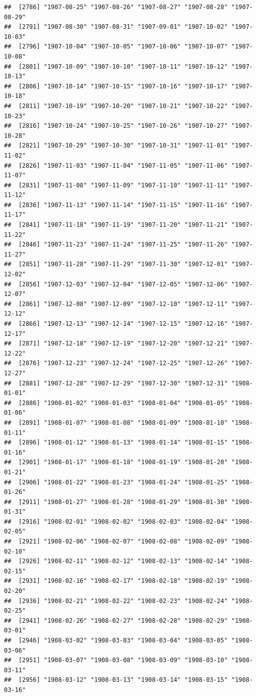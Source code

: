 \documentclass{article}\usepackage[]{graphicx}\usepackage[]{color}
\makeatletter
\newenvironment{kframe}{%
 \def\at@end@of@kframe{}%
 \ifinner\ifhmode%
  \def\at@end@of@kframe{\end{minipage}}%
  \begin{minipage}{\columnwidth}%
 \fi\fi%
 \def\FrameCommand##1{\hskip\@totalleftmargin \hskip-\fboxsep
 \colorbox{shadecolor}{##1}\hskip-\fboxsep
     \hskip-\linewidth \hskip-\@totalleftmargin \hskip\columnwidth}%
 \MakeFramed {\advance\hsize-\width
   \@totalleftmargin\z@ \linewidth\hsize
   \@setminipage}}%
 {\par\unskip\endMakeFramed%
 \at@end@of@kframe}
\newenvironment{knitrout}{}{} %
\makeatother
\begin{document}
\begin{description}
\begin{knitrout}
\begin{kframe}
\begin{verbatim}
##  [2786] "1907-08-25" "1907-08-26" "1907-08-27" "1907-08-28" "1907-08-29"
##  [2791] "1907-08-30" "1907-08-31" "1907-09-01" "1907-10-02" "1907-10-03"
##  [2796] "1907-10-04" "1907-10-05" "1907-10-06" "1907-10-07" "1907-10-08"
##  [2801] "1907-10-09" "1907-10-10" "1907-10-11" "1907-10-12" "1907-10-13"
##  [2806] "1907-10-14" "1907-10-15" "1907-10-16" "1907-10-17" "1907-10-18"
##  [2811] "1907-10-19" "1907-10-20" "1907-10-21" "1907-10-22" "1907-10-23"
##  [2816] "1907-10-24" "1907-10-25" "1907-10-26" "1907-10-27" "1907-10-28"
##  [2821] "1907-10-29" "1907-10-30" "1907-10-31" "1907-11-01" "1907-11-02"
##  [2826] "1907-11-03" "1907-11-04" "1907-11-05" "1907-11-06" "1907-11-07"
##  [2831] "1907-11-08" "1907-11-09" "1907-11-10" "1907-11-11" "1907-11-12"
##  [2836] "1907-11-13" "1907-11-14" "1907-11-15" "1907-11-16" "1907-11-17"
##  [2841] "1907-11-18" "1907-11-19" "1907-11-20" "1907-11-21" "1907-11-22"
##  [2846] "1907-11-23" "1907-11-24" "1907-11-25" "1907-11-26" "1907-11-27"
##  [2851] "1907-11-28" "1907-11-29" "1907-11-30" "1907-12-01" "1907-12-02"
##  [2856] "1907-12-03" "1907-12-04" "1907-12-05" "1907-12-06" "1907-12-07"
##  [2861] "1907-12-08" "1907-12-09" "1907-12-10" "1907-12-11" "1907-12-12"
##  [2866] "1907-12-13" "1907-12-14" "1907-12-15" "1907-12-16" "1907-12-17"
##  [2871] "1907-12-18" "1907-12-19" "1907-12-20" "1907-12-21" "1907-12-22"
##  [2876] "1907-12-23" "1907-12-24" "1907-12-25" "1907-12-26" "1907-12-27"
##  [2881] "1907-12-28" "1907-12-29" "1907-12-30" "1907-12-31" "1908-01-01"
##  [2886] "1908-01-02" "1908-01-03" "1908-01-04" "1908-01-05" "1908-01-06"
##  [2891] "1908-01-07" "1908-01-08" "1908-01-09" "1908-01-10" "1908-01-11"
##  [2896] "1908-01-12" "1908-01-13" "1908-01-14" "1908-01-15" "1908-01-16"
##  [2901] "1908-01-17" "1908-01-18" "1908-01-19" "1908-01-20" "1908-01-21"
##  [2906] "1908-01-22" "1908-01-23" "1908-01-24" "1908-01-25" "1908-01-26"
##  [2911] "1908-01-27" "1908-01-28" "1908-01-29" "1908-01-30" "1908-01-31"
##  [2916] "1908-02-01" "1908-02-02" "1908-02-03" "1908-02-04" "1908-02-05"
##  [2921] "1908-02-06" "1908-02-07" "1908-02-08" "1908-02-09" "1908-02-10"
##  [2926] "1908-02-11" "1908-02-12" "1908-02-13" "1908-02-14" "1908-02-15"
##  [2931] "1908-02-16" "1908-02-17" "1908-02-18" "1908-02-19" "1908-02-20"
##  [2936] "1908-02-21" "1908-02-22" "1908-02-23" "1908-02-24" "1908-02-25"
##  [2941] "1908-02-26" "1908-02-27" "1908-02-28" "1908-02-29" "1908-03-01"
##  [2946] "1908-03-02" "1908-03-03" "1908-03-04" "1908-03-05" "1908-03-06"
##  [2951] "1908-03-07" "1908-03-08" "1908-03-09" "1908-03-10" "1908-03-11"
##  [2956] "1908-03-12" "1908-03-13" "1908-03-14" "1908-03-15" "1908-03-16"

\end{verbatim}
\end{kframe}
\end{knitrout}
\end{description}
\end{document}
